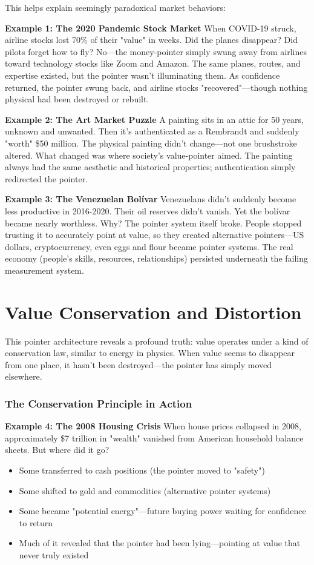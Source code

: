 \documentclass[11pt,oneside]{book}
\begin{document}
This helps explain seemingly paradoxical market behaviors:

\textbf{Example 1: The 2020 Pandemic Stock Market}
When COVID-19 struck, airline stocks lost 70\% of their "value" in weeks. Did the planes disappear? Did pilots forget how to fly? No—the money-pointer simply swung away from airlines toward technology stocks like Zoom and Amazon. The same planes, routes, and expertise existed, but the pointer wasn't illuminating them. As confidence returned, the pointer swung back, and airline stocks "recovered"—though nothing physical had been destroyed or rebuilt.

\textbf{Example 2: The Art Market Puzzle}
A painting sits in an attic for 50 years, unknown and unwanted. Then it's authenticated as a Rembrandt and suddenly "worth" \$50 million. The physical painting didn't change—not one brushstroke altered. What changed was where society's value-pointer aimed. The painting always had the same aesthetic and historical properties; authentication simply redirected the pointer.

\textbf{Example 3: The Venezuelan Bolívar}
Venezuelans didn't suddenly become less productive in 2016-2020. Their oil reserves didn't vanish. Yet the bolívar became nearly worthless. Why? The pointer system itself broke. People stopped trusting it to accurately point at value, so they created alternative pointers—US dollars, cryptocurrency, even eggs and flour became pointer systems. The real economy (people's skills, resources, relationships) persisted underneath the failing measurement system.

\section{Value Conservation and Distortion}

This pointer architecture reveals a profound truth: value operates under a kind of conservation law, similar to energy in physics. When value seems to disappear from one place, it hasn't been destroyed—the pointer has simply moved elsewhere.

\subsubsection{The Conservation Principle in Action}

\textbf{Example 4: The 2008 Housing Crisis}
When house prices collapsed in 2008, approximately \$7 trillion in "wealth" vanished from American household balance sheets. But where did it go?
\begin{itemize}
\item Some transferred to cash positions (the pointer moved to "safety")
\item Some shifted to gold and commodities (alternative pointer systems)
\item Some became "potential energy"—future buying power waiting for confidence to return
\item Much of it revealed that the pointer had been lying—pointing at value that never truly existed
\end{itemize}
\end{document}
